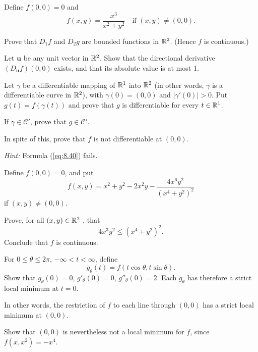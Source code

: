 \begin{myExercise}
    \label{ex:9.14}
    Define $f(0, 0) = 0$ and
    \begin{equation*}
        f(x, y) = \frac{x^3}{x^2+y^2}
        \quad\text{if }(x, y) \neq (0, 0).
    \end{equation*}
    \begin{asparaenum}[(a)]
        \item Prove that $D_1 f$ and $D_2 g$ are bounded functions in ${\protect\mathbb R}^2$. (Hence $f$ is continuous.)
        \item Let $\mathbf{u}$ be any unit vector in ${\protect\mathbb R}^2$. Show that the directional derivative $(D_{\mathbf{u}}f)(0, 0)$ exists, and that its absolute value is at most 1.
        \item Let $\gamma$ be a differentiable mapping of ${\protect\mathbb R}^1$ into ${\protect\mathbb R}^2$ 
        (in other words, $\gamma$ is a differentiable curve in ${\protect\mathbb R}^2$), 
        with $\gamma(0) = (0, 0)$ and $| \gamma'(0) |> 0$. 
        Put $g(t) =  f(\gamma(t))$ and prove that $g$ is differentiable for every $t \in {\protect\mathbb R}^1$.

        If $\gamma \in \mathscr{C}'$, prove that $g \in \mathscr{C}'$.
        \item In spite of this, prove that $f$ is not differentiable at $(0, 0)$.
    \end{asparaenum}
    \emph{Hint:} Formula (\ref{eq:8.40}) fails.
\end{myExercise}


\begin{myExercise}
    \label{ex:9.15}
    Define $f(0, 0) = 0$, and put
    \begin{equation*}
        f(x,y)=x^2+y^2-2x^2y-\frac{4x^6y^2}{(x^4+y^2)^2}
    \end{equation*}
    if $(x,y)\neq (0,0)$.
    \begin{asparaenum}[(a)]
        \item Prove, for all $(x, y) \in {\protect\mathbb R}^2$ , that
        \begin{equation*}
            4x^3y^2 \leq (x^4+y^2)^2.
        \end{equation*}
        Conclude that $f$ is continuous.
        \item For $0 \leq \theta \leq 2\pi$, $-\infty < t < \infty$, define
        \begin{equation*}
            g_{\theta}(t) = f(t\cos \theta, t\sin \theta).
        \end{equation*}
        Show that 
        $g_{\theta} (0) = 0$, 
        $g'_{\theta} (0) = 0$, 
        $g''_{\theta} (0) = 2$. 
        Each $g_{\theta}$ has therefore a strict local minimum at $t = 0$.

        In other words, the restriction of $f$ to each line through $(0, 0)$ has a strict local minimum at $(0, 0)$.
        \item Show that $(0, 0)$ is nevertheless not a local minimum for $f$, since $f(x, x^2) = -x^4$.
    \end{asparaenum}
\end{myExercise}


